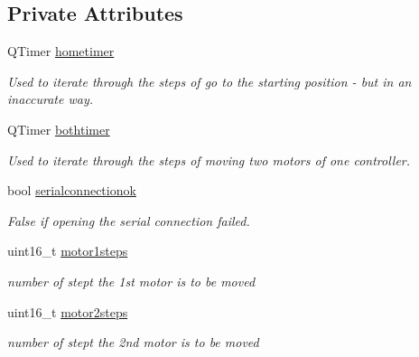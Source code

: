 \subsection*{Private Attributes}
\begin{DoxyCompactItemize}
\item 
Q\+Timer \hyperlink{classMotor_adbb59f89d592f1569ba8ad05c5c58a73}{hometimer}
\begin{DoxyCompactList}\small\item\em Used to iterate through the steps of \textquotesingle{}go to the starting position\textquotesingle{} -\/ but in an inaccurate way. \end{DoxyCompactList}\item 
\mbox{\label{classMotor_a97bf769ce21887450f412554520f4f20}} 
Q\+Timer \hyperlink{classMotor_a97bf769ce21887450f412554520f4f20}{bothtimer}
\begin{DoxyCompactList}\small\item\em Used to iterate through the steps of moving two motors of one controller. \end{DoxyCompactList}\item 
\mbox{\label{classMotor_a65cf2259e3d3e61ea7e268b99f8089a0}} 
bool \hyperlink{classMotor_a65cf2259e3d3e61ea7e268b99f8089a0}{serialconnectionok}
\begin{DoxyCompactList}\small\item\em False if opening the serial connection failed. \end{DoxyCompactList}\item 
\mbox{\label{classMotor_a09aaad8e6e0ea959ac4712677443d8f0}} 
uint16\+\_\+t \hyperlink{classMotor_a09aaad8e6e0ea959ac4712677443d8f0}{motor1steps}
\begin{DoxyCompactList}\small\item\em number of stept the 1st motor is to be moved \end{DoxyCompactList}\item 
\mbox{\label{classMotor_af12031af563931e69915308aa0cce190}} 
uint16\+\_\+t \hyperlink{classMotor_af12031af563931e69915308aa0cce190}{motor2steps}
\begin{DoxyCompactList}\small\item\em number of stept the 2nd motor is to be moved \end{DoxyCompactList}\end{DoxyCompactItemize}


